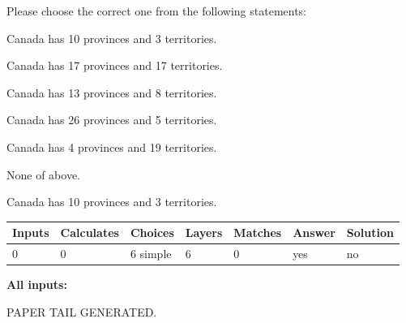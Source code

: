 \documentclass[12pt]{article}
\begin{document}
  
Please choose the correct one from the following statements:
 
 
Canada has 10  provinces and 3 territories.
 
 
Canada has  17 provinces and  17 territories.
 
 
Canada has  13 provinces and  8 territories.
 
 
Canada has  26 provinces and  5 territories.
 
 
Canada has   4 provinces and  19 territories.
 
 
 None of above.
 
 
\noindent{}
 
 
Canada has 10  provinces and 3 territories.
 
 
\noindent{}
 
 
   
   
   
   
\noindent\begin{tabular}{|l|l|l|l|l|l|l|}
 \hline
Inputs & Calculates & Choices & Layers & Matches & Answer & Solution \\ \hline
 0  & 
 0  & 
 6
  simple  
  & 
 6  & 
 0  & 
  yes & 
  no 
  \\ \hline
 \end{tabular}
   
   
   
   
\noindent{}
   
   
   
   
\noindent\vspace{0.1in}\hspace{-0.08in} {\textbf{\Large{All inputs: }}}
   
   
   
   
   
   
 \vspace{0.2in}
 
   
   
\vspace{2.0in} PAPER TAIL GENERATED.
   
   
   
\end{document}
